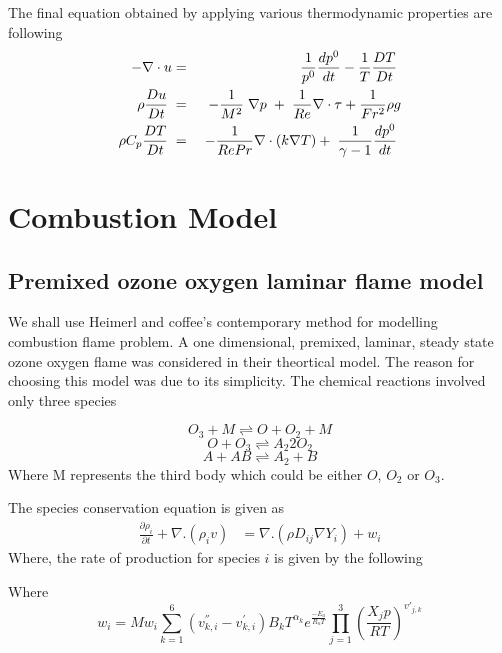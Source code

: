 \documentclass[10pt]{ubthesis}
\begin{document}
The final equation obtained by applying various thermodynamic properties are following
\begin{eqnarray}
-\nabla \cdot u &=& \frac{1}{p^0} \frac{d p^0}{d t} - \frac{1}{T}\frac{D T}{D t} \hspace{1mm}\\
\rho \frac{D u}{D t} \hspace{1mm} &=& -\frac{1}{M^2}\hspace{1mm}\nabla p\hspace{1mm}+\hspace{1mm}\frac{1}{Re}\nabla \cdot \tau + \frac{1}{Fr^2}\rho g \\
\rho C_p \frac{D T}{D t} \hspace{1mm}&=&\hspace{1mm} -  \frac{1}{Re Pr}\nabla\cdot (k \nabla T) + \hspace{1mm} \frac{1}{\gamma -1} \frac{d p^0}{d t}\hspace{1mm}\\
\end{eqnarray}
\chapter{Combustion Model}
\section{Premixed ozone oxygen laminar flame model}
We shall use Heimerl and coffee's contemporary method for modelling combustion flame problem. A one dimensional, premixed, laminar, steady state ozone oxygen flame was considered in their theortical model. The reason for choosing this model was due to its simplicity. The chemical reactions involved only three species 


			$$O_3 + M \rightleftharpoons O + O_2 + M $$
			$$ O + O_3 \rightleftharpoons A_2  2O_2$$ 
			$$A + AB \rightleftharpoons A_2 + B$$
\noindent Where M represents the third body which could be either $O$, $O_2$ or $O_3$. 

\noindent The species conservation equation is given as 
\begin{eqnarray}
	\frac{\partial \rho_i}{\partial t} + \nabla . (\rho_i v) &= \nabla . (\rho D_{ij} \nabla Y_i) + w_i
\end{eqnarray}
\noindent Where, the rate of production for species $i$ is given by the following 
	
Where $$w_i = Mw_i \sum_{k=1}^{6}(v_{k,i}^{''} - v_{k,i}^{'}) B_k T^{\alpha_k} e^{\frac{-E_a}{R_u T}} \prod_{j=1}^3 \left(\frac{X_j p}{R T} \right)^{v'_{j,k}}$$
\end{document}
